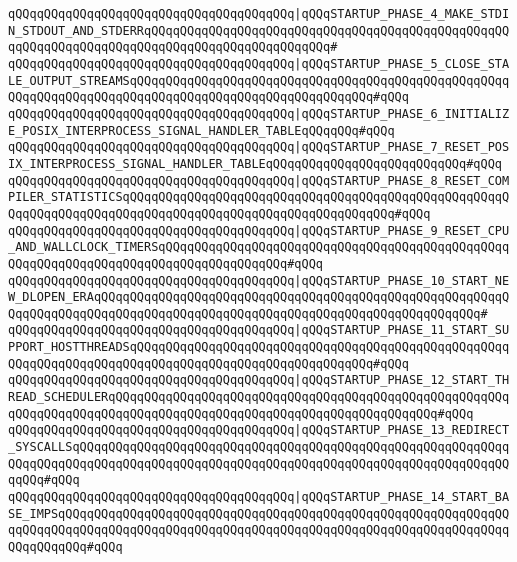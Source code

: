 \verb|qQQqqQQqqQQqqQQqqQQqqQQqqQQqqQQqqQQqqQQq|\verb#|qQQqSTARTUP_PHASE_4_MAKE_STDIN_STDOUT_AND_STDERRqQQqqQQqqQQqqQQqqQQqqQQqqQQqqQQqqQQqqQQqqQQqqQQqqQQqqQQqqQQqqQQqqQQqqQQqqQQqqQQqqQQqqQQqqQQqqQQq#\verb|#|\newline
\verb|qQQqqQQqqQQqqQQqqQQqqQQqqQQqqQQqqQQqqQQq|\verb#|qQQqSTARTUP_PHASE_5_CLOSE_STALE_OUTPUT_STREAMSqQQqqQQqqQQqqQQqqQQqqQQqqQQqqQQqqQQqqQQqqQQqqQQqqQQqqQQqqQQqqQQqqQQqqQQqqQQqqQQqqQQqqQQqqQQqqQQqqQQqqQQq#\verb|#qQQq|\newline
\verb|qQQqqQQqqQQqqQQqqQQqqQQqqQQqqQQqqQQqqQQq|\verb#|qQQqSTARTUP_PHASE_6_INITIALIZE_POSIX_INTERPROCESS_SIGNAL_HANDLER_TABLEqQQqqQQq#\verb|#qQQq|\newline
\verb|qQQqqQQqqQQqqQQqqQQqqQQqqQQqqQQqqQQqqQQq|\verb#|qQQqSTARTUP_PHASE_7_RESET_POSIX_INTERPROCESS_SIGNAL_HANDLER_TABLEqQQqqQQqqQQqqQQqqQQqqQQqqQQq#\verb|#qQQq|\newline
\verb|qQQqqQQqqQQqqQQqqQQqqQQqqQQqqQQqqQQqqQQq|\verb#|qQQqSTARTUP_PHASE_8_RESET_COMPILER_STATISTICSqQQqqQQqqQQqqQQqqQQqqQQqqQQqqQQqqQQqqQQqqQQqqQQqqQQqqQQqqQQqqQQqqQQqqQQqqQQqqQQqqQQqqQQqqQQqqQQqqQQqqQQqqQQq#\verb|#qQQq|\newline
\verb|qQQqqQQqqQQqqQQqqQQqqQQqqQQqqQQqqQQqqQQq|\verb#|qQQqSTARTUP_PHASE_9_RESET_CPU_AND_WALLCLOCK_TIMERSqQQqqQQqqQQqqQQqqQQqqQQqqQQqqQQqqQQqqQQqqQQqqQQqqQQqqQQqqQQqqQQqqQQqqQQqqQQqqQQqqQQqqQQq#\verb|#qQQq|\newline
\verb|qQQqqQQqqQQqqQQqqQQqqQQqqQQqqQQqqQQqqQQq|\verb#|qQQqSTARTUP_PHASE_10_START_NEW_DLOPEN_ERAqQQqqQQqqQQqqQQqqQQqqQQqqQQqqQQqqQQqqQQqqQQqqQQqqQQqqQQqqQQqqQQqqQQqqQQqqQQqqQQqqQQqqQQqqQQqqQQqqQQqqQQqqQQqqQQqqQQqqQQqqQQq#\verb|#|\newline
\verb|qQQqqQQqqQQqqQQqqQQqqQQqqQQqqQQqqQQqqQQq|\verb#|qQQqSTARTUP_PHASE_11_START_SUPPORT_HOSTTHREADSqQQqqQQqqQQqqQQqqQQqqQQqqQQqqQQqqQQqqQQqqQQqqQQqqQQqqQQqqQQqqQQqqQQqqQQqqQQqqQQqqQQqqQQqqQQqqQQqqQQqqQQq#\verb|#qQQq|\newline
\verb|qQQqqQQqqQQqqQQqqQQqqQQqqQQqqQQqqQQqqQQq|\verb#|qQQqSTARTUP_PHASE_12_START_THREAD_SCHEDULERqQQqqQQqqQQqqQQqqQQqqQQqqQQqqQQqqQQqqQQqqQQqqQQqqQQqqQQqqQQqqQQqqQQqqQQqqQQqqQQqqQQqqQQqqQQqqQQqqQQqqQQqqQQqqQQqqQQq#\verb|#qQQq|\newline
\verb|qQQqqQQqqQQqqQQqqQQqqQQqqQQqqQQqqQQqqQQq|\verb#|qQQqSTARTUP_PHASE_13_REDIRECT_SYSCALLSqQQqqQQqqQQqqQQqqQQqqQQqqQQqqQQqqQQqqQQqqQQqqQQqqQQqqQQqqQQqqQQqqQQqqQQqqQQqqQQqqQQqqQQqqQQqqQQqqQQqqQQqqQQqqQQqqQQqqQQqqQQqqQQqqQQqqQQq#\verb|#qQQq|\newline
\verb|qQQqqQQqqQQqqQQqqQQqqQQqqQQqqQQqqQQqqQQq|\verb#|qQQqSTARTUP_PHASE_14_START_BASE_IMPSqQQqqQQqqQQqqQQqqQQqqQQqqQQqqQQqqQQqqQQqqQQqqQQqqQQqqQQqqQQqqQQqqQQqqQQqqQQqqQQqqQQqqQQqqQQqqQQqqQQqqQQqqQQqqQQqqQQqqQQqqQQqqQQqqQQqqQQqqQQqqQQq#\verb|#qQQq|\newline
